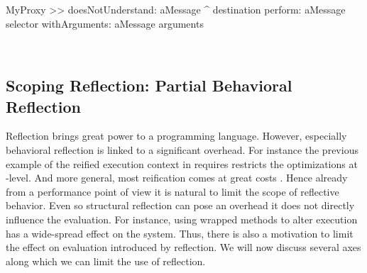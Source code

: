 \begin{stcode}{}
MyProxy >> doesNotUnderstand: aMessage
	^ destination 
		perform: aMessage selector
		withArguments: aMessage arguments
\end{stcode}

\\

\subsection{Scoping Reflection: Partial Behavioral Reflection}
Reflection brings great power to a programming language.
However, especially behavioral reflection is linked to a significant overhead.
For instance the previous example of the reified execution context in \ST requires restricts the optimizations at \VM-level.
And more general, most reification comes at great costs \cite{Male96a}.
Hence already from a performance point of view it is natural to limit the scope of reflective behavior.
Even so structural reflection can pose an overhead it does not directly influence the evaluation.
For instance, using wrapped methods to alter execution has a wide-spread effect on the system.
Thus, there is also a motivation to limit the effect on evaluation introduced by reflection.
We will now discuss several axes along which we can limit the use of reflection.
%
